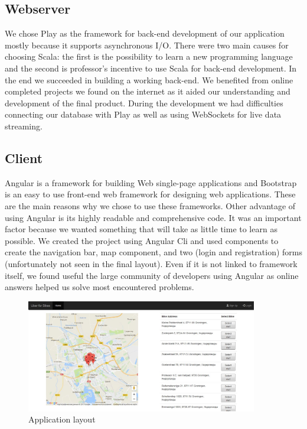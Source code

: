 \subsection{Webserver}
We chose Play as the framework for back-end development of our application mostly because it supports asynchronous I/O. There were two main causes for choosing Scala: the first is the possibility to learn a new programming language and the second is professor's incentive to use Scala for back-end development. In the end we succeeded in building a working back-end. We benefited from online completed projects we found on the internet as it aided our understanding and development of the final product. During the development we had difficulties connecting our database with Play as well as using WebSockets for live data streaming.

\subsection{Client}
Angular is a framework for building Web single-page applications and Bootstrap is an easy to use front-end web framework for designing web applications. These are the main reasons why we chose to use these frameworks. Other advantage of using Angular is its highly readable and comprehensive code. It was an important factor because we wanted something that will take as little time to learn as possible. We created the project using Angular Cli and used components to create the navigation bar, map component, and two (login and registration) forms (unfortunately not seen in the final layout). Even if it is not linked to framework itself, we found useful the large community of developers using Angular as online answers helped us solve most encountered problems.

\begin{figure}[H]
		\centering
		\includegraphics[width=0.9\textwidth]{images/screenshot.png}
		\caption{Application layout}
		\label{front-end}
	\end{figure}